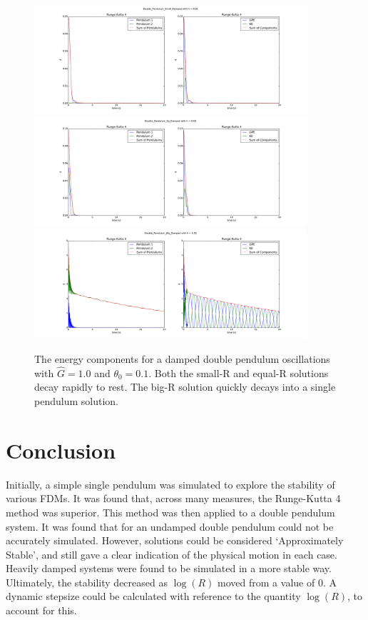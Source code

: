 \documentclass{article}
\begin{document}
\begin{figure}
\begin{center}
\includegraphics[width=0.9\textwidth]{Double_Pendulum_Small_Damped_Energy_Components}
\includegraphics[width=0.9\textwidth]{Double_Pendulum_Eq_Damped_Energy_Components}
\includegraphics[width=0.9\textwidth]{Double_Pendulum_Big_Damped_Energy_Components}
\caption{The energy components for a damped double pendulum oscillations with $\hat{G}=1.0$ and $\theta_{0} = 0.1$. Both the small-R and equal-R solutions decay rapidly to rest. The big-R solution quickly decays into a single pendulum solution.}
\label{fig:doubledampedenergy}
\end{center}
\end{figure}

\section{Conclusion}
Initially, a simple single pendulum was simulated to explore the stability of various FDMs. It was found that, across many measures, the Runge-Kutta 4 method was superior. This method was then applied to a double pendulum system. It was found that for an undamped double pendulum could not be accurately simulated. However, solutions could be considered \textquoteleft Approximately Stable', and still gave a clear indication of the physical motion in each case. Heavily damped systems were found to be simulated in a more stable way. Ultimately, the stability decreased as $\log(R)$ moved from a value of 0. A dynamic stepsize could be calculated with reference to the quantity $\log(R)$, to account for this.
\end{document}
